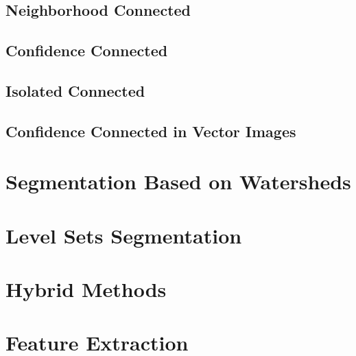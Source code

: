 \label{sec:ConnectedThreshold}
\ifitkFullVersion 

\fi


\subsection{Neighborhood Connected}
\label{sec:NeighborhoodConnectedImageFilter}
\ifitkFullVersion 

\fi


\subsection{Confidence Connected}
\label{sec:ConfidenceConnected}
\ifitkFullVersion 

\fi


\subsection{Isolated Connected}
\label{sec:IsolatedConnected}
\ifitkFullVersion 

\fi


\subsection{Confidence Connected in Vector Images}
\label{sec:VectorConfidenceConnected}
\ifitkFullVersion 

\fi


\section{Segmentation Based on Watersheds}
\label{sec:WatershedSegmentation}
\ifitkFullVersion 

\fi


\clearpage

\section{Level Sets Segmentation}
\label{sec:LevelSetsSegmentation}
\ifitkFullVersion 

\fi


\section{Hybrid Methods} 
\label{sec:HybridSegmentationMethods}

\ifitkFullVersion 

\fi


\section{Feature Extraction} 
\label{sec:FeatureExtractionMethods}

\ifitkFullVersion 

\fi


